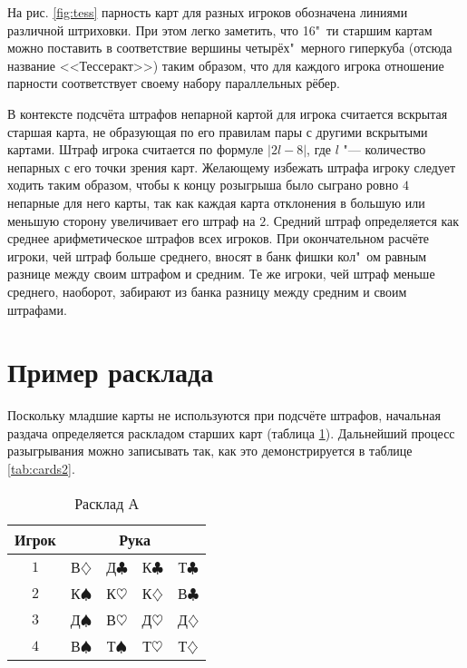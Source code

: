 На рис. \ref{fig:tess} парность карт для разных игроков обозначена линиями различной штриховки. При этом легко заметить, что 16"~ти старшим картам можно поставить в соответствие вершины четырёх"~мерного гиперкуба (отсюда название <<Тессеракт>>) таким образом, что для каждого игрока отношение парности соответствует своему набору параллельных рёбер.

В контексте подсчёта штрафов непарной картой для игрока считается вскрытая старшая карта, не образующая по его правилам пары с другими вскрытыми картами. Штраф игрока считается по формуле $\left|2l-8\right|$, где $l$ "--- количество непарных с его точки зрения карт. Желающему избежать штрафа игроку следует ходить таким образом, чтобы к концу розыгрыша было сыграно ровно $4$ непарные для него карты, так как каждая карта отклонения в большую или меньшую сторону увеличивает его штраф на $2$. Средний штраф определяется как среднее арифметическое штрафов всех игроков. При окончательном расчёте игроки, чей штраф больше среднего, вносят в банк фишки кол"~ом равным разнице между своим штрафом и средним. Те же игроки, чей штраф меньше среднего, наоборот, забирают из банка разницу между средним и своим штрафами.

\section{Пример расклада}\label{app:D2}

Поскольку младшие карты не используются при подсчёте штрафов, начальная раздача определяется раскладом старших карт (таблица \ref{tab:cards1}). Дальнейший процесс разыгрывания можно записывать так, как это демонстрируется в таблице \ref{tab:cards2}.

\begin{table}[htbp]
	\centering
	\caption{Расклад А}
	\label{tab:cards1}
	\begin{SingleSpace}
		\begin{tabular}{|c|cccc|}
			\hline
			Игрок & \multicolumn{4}{c|}{Рука} \\
			\hline
			$1$ & В$\diamondsuit$ & Д$\clubsuit$ & К$\clubsuit$ & Т$\clubsuit$ \\
			$2$ & К$\spadesuit$ & К$\heartsuit$ & К$\diamondsuit$ & В$\clubsuit$ \\
			$3$ & Д$\spadesuit$ & В$\heartsuit$ & Д$\heartsuit$ & Д$\diamondsuit$ \\
			$4$ & В$\spadesuit$ & Т$\spadesuit$ & Т$\heartsuit$ & Т$\diamondsuit$ \\
			\hline
		\end{tabular}
	\end{SingleSpace}
\end{table}

